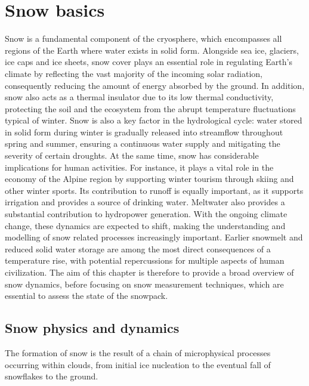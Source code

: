 \chapter{Snow basics}
\label{cap:snow_basics}

Snow is a fundamental component of the cryosphere, which encompasses all regions of the Earth where water exists in solid form. 
Alongside sea ice, glaciers, ice caps and ice sheets, snow cover plays an essential role in regulating Earth's climate by reflecting the vast 
majority of the incoming solar radiation, consequently reducing the amount of energy absorbed by the ground. In addition, snow also acts as a thermal 
insulator due to its low thermal conductivity, protecting the soil and the ecosystem from  the abrupt temperature fluctuations typical of winter. Snow 
is also a key factor in the hydrological cycle: water stored in solid form during winter is gradually released into streamflow throughout spring and summer, 
ensuring a continuous water supply and mitigating the severity of certain droughts. At the same time, snow has considerable implications for human 
activities. For instance, it plays a vital role in the economy of the Alpine region by supporting winter tourism through skiing and other winter sports. 
Its contribution to runoff is equally important, as it supports irrigation and provides a source of drinking water. Meltwater also provides a 
substantial contribution to hydropower generation. With the ongoing climate change, these dynamics are expected to shift, making the 
understanding and modelling of snow related processes increasingly important. Earlier snowmelt and reduced solid water storage are among the most direct 
consequences of a temperature rise, with potential repercussions for multiple aspects of human civilization. The aim of this chapter is therefore to 
provide a broad overview of snow dynamics, before focusing on snow measurement techniques, which are essential to assess the state of the snowpack.










\section{Snow physics and dynamics}

The formation of snow is the result of a chain of microphysical processes occurring within clouds, from initial ice nucleation to the eventual fall 
of snowflakes to the ground. 

